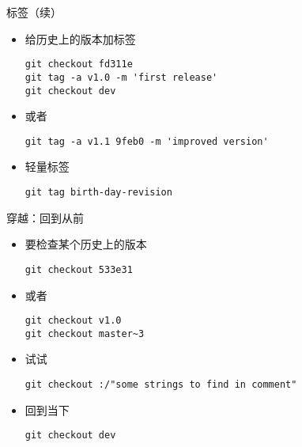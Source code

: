 \begin{frame}[<+->][fragile]{标签（续）}
    \begin{itemize}
        \item 给历史上的版本加标签
        \begin{Verbatim}[frame=single,commandchars=\\\{\}]
git checkout fd311e
git tag -a v1.0 -m 'first release'
git checkout dev
        \end{Verbatim}
        \item 或者
        \begin{Verbatim}[frame=single,commandchars=\\\{\}]
git tag -a v1.1 9feb0 -m 'improved version'
        \end{Verbatim}
        \item 轻量标签
        \begin{Verbatim}[frame=single,commandchars=\\\{\}]
git tag birth-day-revision
        \end{Verbatim}
    \end{itemize}
\end{frame}

\begin{frame}[<+->][fragile]{穿越：回到从前}
    \begin{itemize}
        \item 要检查某个历史上的版本
\begin{Verbatim}[frame=single,commandchars=\\\{\}]
git checkout 533e31
\end{Verbatim}
        \item 或者
\begin{Verbatim}[frame=single,commandchars=\\\{\}]
git checkout v1.0
git checkout master~3
\end{Verbatim}
        \item 试试
\begin{Verbatim}[frame=single,commandchars=\\\{\}]
git checkout :/"some strings to find in comment"
\end{Verbatim}
        \item 回到当下
\begin{Verbatim}[frame=single,commandchars=\\\{\}]
git checkout dev
\end{Verbatim}
    \end{itemize}
\end{frame}

